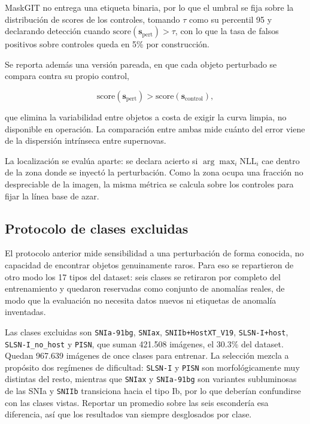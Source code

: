 MaskGIT no entrega una etiqueta binaria, por lo que el umbral se fija sobre la distribución de scores de los controles, tomando $\tau$ como su percentil 95 y declarando detección cuando $\mathrm{score}(\mathbf{s}_{\mathrm{pert}}) > \tau$, con lo que la tasa de falsos positivos sobre controles queda en 5\% por construcción.

Se reporta además una versión pareada, en que cada objeto perturbado se compara contra su propio control,

\begin{equation}
\mathrm{score}(\mathbf{s}_{\mathrm{pert}}) > \mathrm{score}(\mathbf{s}_{\mathrm{control}}),
\end{equation}

que elimina la variabilidad entre objetos a costa de exigir la curva limpia, no disponible en operación. La comparación entre ambas mide cuánto del error viene de la dispersión intrínseca entre supernovas.

La localización se evalúa aparte: se declara acierto si $\arg\max_i \mathrm{NLL}_i$ cae dentro de la zona donde se inyectó la perturbación. Como la zona ocupa una fracción no despreciable de la imagen, la misma métrica se calcula sobre los controles para fijar la línea base de azar.

\subsection{Protocolo de clases excluidas}
\label{sec:protocolo_heldout}

El protocolo anterior mide sensibilidad a una perturbación de forma conocida, no capacidad de encontrar objetos genuinamente raros. Para eso se repartieron de otro modo los 17 tipos del dataset: seis clases se retiraron por completo del entrenamiento y quedaron reservadas como conjunto de anomalías reales, de modo que la evaluación no necesita datos nuevos ni etiquetas de anomalía inventadas.

Las clases excluidas son \texttt{SNIa-91bg}, \texttt{SNIax}, \texttt{SNIIb+HostXT\_V19}, \texttt{SLSN-I+host}, \texttt{SLSN-I\_no\_host} y \texttt{PISN}, que suman 421.508 imágenes, el 30.3\% del dataset. Quedan 967.639 imágenes de once clases para entrenar. La selección mezcla a propósito dos regímenes de dificultad: \texttt{SLSN-I} y \texttt{PISN} son morfológicamente muy distintas del resto, mientras que \texttt{SNIax} y \texttt{SNIa-91bg} son variantes subluminosas de las SNIa y \texttt{SNIIb} transiciona hacia el tipo Ib, por lo que deberían confundirse con las clases vistas. Reportar un promedio sobre las seis escondería esa diferencia, así que los resultados van siempre desglosados por clase.

